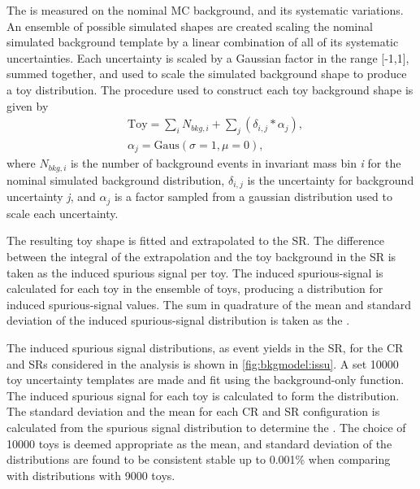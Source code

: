 The \ISSU is measured on the nominal MC background, and its systematic variations. An ensemble of possible simulated shapes are created scaling the nominal simulated background template by a linear combination of all of its systematic uncertainties. Each uncertainty is scaled by a Gaussian factor in the range [-1,1], summed together, and used to scale the simulated background shape to produce a toy distribution. The procedure used to construct each toy background shape is given by
\begin{equation}
    \label{eq:issutoy}
    \begin{aligned}
        & \mathrm{Toy} = \sum_{i} N_{bkg,i} + \sum_{j} \left(\delta_{i,j} * \alpha_{j}\right), \\
        & \alpha_j = \mathrm{Gaus}(\sigma=1,\mu=0),
    \end{aligned}
\end{equation}
where $N_{bkg,i}$ is the number of background events in invariant mass bin \emph{i} for the nominal simulated background distribution, $\delta_{i,j}$ is the uncertainty for background uncertainty \emph{j}, and $\alpha_j$ is a factor sampled from a gaussian distribution used to scale each uncertainty.

The resulting toy shape is fitted and extrapolated to the SR. The difference between the integral of the extrapolation and the toy background in the SR is taken as the induced spurious signal per toy. The induced spurious-signal is calculated for each toy in the ensemble of toys, producing a distribution for induced spurious-signal values. The sum in quadrature of the mean and standard deviation of the induced spurious-signal distribution is taken as the \ISSU. 

The induced spurious signal distributions, as event yields in the SR, for the CR and SRs considered in the analysis is shown in \cref{fig:bkgmodel:issu}. A set 10000 toy uncertainty templates are made and fit using the background-only function. The induced spurious signal for each toy is calculated to form the distribution. The standard deviation and the mean for each CR and SR configuration is calculated from the spurious signal distribution to determine the \ISSU. The choice of 10000 toys is deemed appropriate as the mean, and standard deviation of the distributions are found to be consistent stable up to 0.001\% when comparing with distributions with 9000 toys.

